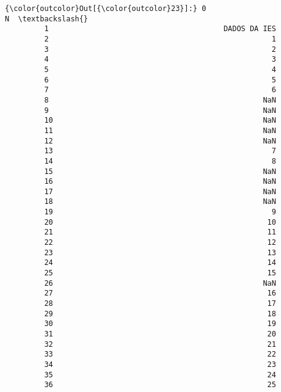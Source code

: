 \documentclass[11pt]{article}
\begin{document}
\begin{Verbatim}[commandchars=\\\{\}]
{\color{outcolor}Out[{\color{outcolor}23}]:} 0                                                   N  \textbackslash{}
         1                                        DADOS DA IES   
         2                                                   1   
         3                                                   2   
         4                                                   3   
         5                                                   4   
         6                                                   5   
         7                                                   6   
         8                                                 NaN   
         9                                                 NaN   
         10                                                NaN   
         11                                                NaN   
         12                                                NaN   
         13                                                  7   
         14                                                  8   
         15                                                NaN   
         16                                                NaN   
         17                                                NaN   
         18                                                NaN   
         19                                                  9   
         20                                                 10   
         21                                                 11   
         22                                                 12   
         23                                                 13   
         24                                                 14   
         25                                                 15   
         26                                                NaN   
         27                                                 16   
         28                                                 17   
         29                                                 18   
         30                                                 19   
         31                                                 20   
         32                                                 21   
         33                                                 22   
         34                                                 23   
         35                                                 24   
         36                                                 25   

\end{Verbatim}
\end{document}
